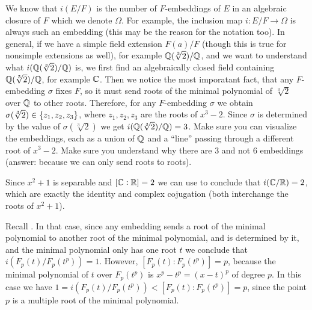 \documentclass[11pt,a4paper]{article}
\begin{document}
\begin{remark}
  We know that $i(E/F)$ is the number of $F$-embeddings of $E$ in
  an algebraic closure of $F$ which we denote $\Omega$.
  For example, the inclusion map $i \colon E/F \to \Omega$
  is always such an embedding (this may be the reason for the notation too).
  In general, if we have a simple field extension $F(a)/F$ (though
  this is true for nonsimple extensions as well),
  for example $\mathbb{Q}(\sqrt[3]{2})/\mathbb{Q}$,
  and we want to understand what $i(\mathbb{Q}(\sqrt[3]{2})/\mathbb{Q})$ is,
  we first find an algebraically closed field containing $\mathbb{Q}(\sqrt[3]{2})/\mathbb{Q}$,
  for example $\mathbb{C}$.
  Then we notice the most imporatant fact,
  that any $F$-embedding $\sigma$ fixes $F$,
  so it must send roots of the minimal polynomial of $\sqrt[3]{2}$ over $\mathbb{Q}$
  to other roots.
  Therefore, for any $F$-embedding $\sigma$ we obtain
  $\sigma(\sqrt[3]{2}) \in \left\{z_1,z_2,z_3\right\}$,
  where $z_1,z_2,z_3$ are the roots of $x^3 - 2$.
  Since $\sigma$ is determined by the value of $\sigma(\sqrt[3]{2})$
  we get $i(\mathbb{Q}(\sqrt[3]{2})/\mathbb{Q}) = 3$.
  Make sure you can visualize the embeddings, each as a union of $\mathbb{Q}$
  and a ``line'' passing through a different root of $x^3 - 2$.
  Make sure you understand why there are $3$ and not $6$ embeddings
  (answer: because we can only send roots to roots).
\end{remark}

\begin{example}
  Since $x^2 + 1$ is separable and $[\mathbb{C} : \mathbb{R}] = 2$
  we can use  to conclude that $i(\mathbb{C}/\mathbb{R}) = 2$,
  which are exactly the identity and complex cojugation (both interchange
  the roots of $x^2 + 1$).
\end{example}

\begin{example}
  Recall .
  In that case, since any embedding sends a root of
  the minimal polynomial to another root of the minimal polynomial,
  and is determined by it, and the minimal polynomial
  only has one root $t$ we conclude that $i(F_p(t)/F_p(t^p)) = 1$.
  However, $[F_p(t) : F_p(t^p)] = p$,
  because the minimal polynomial of $t$ over $F_p(t^p)$
  is $x^p - t^p = (x - t)^p$ of degree $p$.
  In this case we have $1 = i(F_p(t)/F_p(t^p)) < [F_p(t) : F_p(t^p)] = p$,
  since the point $p$ is a multiple root of the minimal polynomial.
\end{example}
\end{document}
